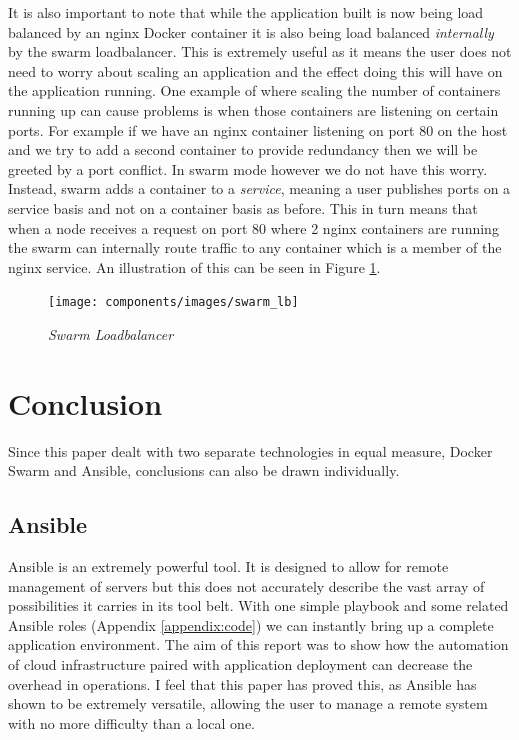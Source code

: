\documentclass{article}
\begin{document}
It is also important to note that while the application built is now being load balanced by an nginx Docker container it is also being load balanced \textit{internally} by the swarm loadbalancer. This is extremely useful as it means the user does not need to worry about scaling an application and the effect doing this will have on the application running. One example of where scaling the number of containers running up can cause problems is when those containers are listening on certain ports. For example if we have an nginx container listening on port 80 on the host and we try to add a second container to provide redundancy then we will be greeted by a port conflict. In swarm mode however we do not have this worry. Instead, swarm adds a container to a \textit{service}, meaning a user publishes ports on a service basis and not on a container basis as before. This in turn means that when a node receives a request on port 80 where 2 nginx containers are running the swarm can internally route traffic to any container which is a member of the nginx service. An illustration of this can be seen in Figure \ref{fig:swarm_lb}.

\begin{figure}[!h]
\centering
\texttt{[image: components/images/swarm\_lb]}
\caption{\em Swarm Loadbalancer}
\label{fig:swarm_lb}
\end{figure}

\newpage
\section{Conclusion}
\label{sec:Conclusion}
Since this paper dealt with two separate technologies in equal measure, Docker Swarm and Ansible, conclusions can also be drawn individually. 

\subsection{Ansible}
Ansible is an extremely powerful tool. It is designed to allow for remote management of servers but this does not accurately describe the vast array of possibilities it carries in its tool belt. With one simple playbook and some related Ansible roles (Appendix \ref{appendix:code}) we can instantly bring up a complete application environment. The aim of this report was to show how the automation of cloud infrastructure paired with application deployment can decrease the overhead in operations. I feel that this paper has proved this, as Ansible has shown to be extremely versatile, allowing the user to manage a remote system with no more difficulty than a local one.
\end{document}
